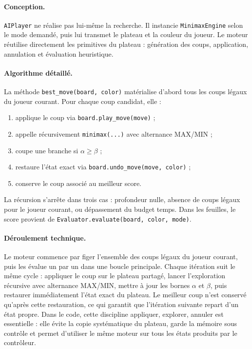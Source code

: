 \documentclass[a4paper]{article}
\begin{document}
\paragraph{Conception.}
\texttt{AIPlayer} ne réalise pas lui-même la recherche. Il instancie \texttt{MinimaxEngine} selon le mode demandé, puis lui transmet le plateau et la couleur du joueur. Le moteur réutilise directement les primitives du plateau : génération des coups, application, annulation et évaluation heuristique.

\paragraph{Algorithme détaillé.}
La méthode \texttt{best\_move(board, color)} matérialise d'abord tous les coups légaux du joueur courant. Pour chaque coup candidat, elle :
\begin{enumerate}
    \item applique le coup via \texttt{board.play\_move(move)} ;
    \item appelle récursivement \texttt{minimax(...)} avec alternance MAX/MIN ;
    \item coupe une branche si $\alpha \geq \beta$ ;
    \item restaure l'état exact via \texttt{board.undo\_move(move, color)} ;
    \item conserve le coup associé au meilleur score.
\end{enumerate}

La récursion s'arrête dans trois cas : profondeur nulle, absence de coups légaux pour le joueur courant, ou dépassement du budget temps. Dans les feuilles, le score provient de \texttt{Evaluator.evaluate(board, color, mode)}.

\paragraph{Déroulement technique.}
Le moteur commence par figer l'ensemble des coups légaux du joueur courant, puis les évalue un par un dans une boucle principale. Chaque itération suit le même cycle : appliquer le coup sur le plateau partagé, lancer l'exploration récursive avec alternance MAX/MIN, mettre à jour les bornes $\alpha$ et $\beta$, puis restaurer immédiatement l'état exact du plateau. Le meilleur coup n'est conservé qu'après cette restauration, ce qui garantit que l'itération suivante repart d'un état propre. Dans le code, cette discipline \og appliquer, explorer, annuler \fg{} est essentielle : elle évite la copie systématique du plateau, garde la mémoire sous contrôle et permet d'utiliser le même moteur sur tous les états produits par le contrôleur.
\end{document}
